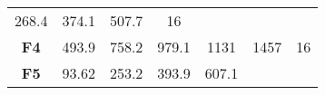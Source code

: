 \documentclass[12pt,a4paper]{article}
\begin{document}
\begin{longtable}[c]{@{}ccccccc@{}}
\begin{minipage}[t]{0.09\columnwidth}\centering\strut
268.4
\strut\end{minipage} &
\begin{minipage}[t]{0.10\columnwidth}\centering\strut
374.1
\strut\end{minipage} &
\begin{minipage}[t]{0.11\columnwidth}\centering\strut
507.7
\strut\end{minipage} &
\begin{minipage}[t]{0.07\columnwidth}\centering\strut
16
\strut\end{minipage}\tabularnewline
\begin{minipage}[t]{0.11\columnwidth}\centering\strut
\textbf{F4}
\strut\end{minipage} &
\begin{minipage}[t]{0.08\columnwidth}\centering\strut
493.9
\strut\end{minipage} &
\begin{minipage}[t]{0.08\columnwidth}\centering\strut
758.2
\strut\end{minipage} &
\begin{minipage}[t]{0.09\columnwidth}\centering\strut
979.1
\strut\end{minipage} &
\begin{minipage}[t]{0.10\columnwidth}\centering\strut
1131
\strut\end{minipage} &
\begin{minipage}[t]{0.11\columnwidth}\centering\strut
1457
\strut\end{minipage} &
\begin{minipage}[t]{0.07\columnwidth}\centering\strut
16
\strut\end{minipage}\tabularnewline
\begin{minipage}[t]{0.11\columnwidth}\centering\strut
\textbf{F5}
\strut\end{minipage} &
\begin{minipage}[t]{0.08\columnwidth}\centering\strut
93.62
\strut\end{minipage} &
\begin{minipage}[t]{0.08\columnwidth}\centering\strut
253.2
\strut\end{minipage} &
\begin{minipage}[t]{0.09\columnwidth}\centering\strut
393.9
\strut\end{minipage} &
\begin{minipage}[t]{0.10\columnwidth}\centering\strut
607.1
\strut\end{minipage} &

\end{longtable}
\end{document}
